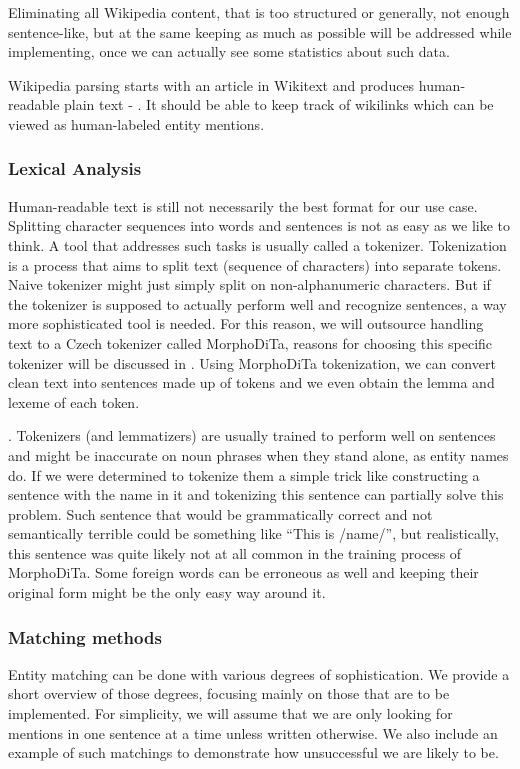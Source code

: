 Eliminating all Wikipedia content, that is too structured or generally, not enough sentence-like, but at the same keeping as much as possible will be addressed while implementing, once we can actually see some statistics about such data.

Wikipedia parsing starts with an article in Wikitext and produces human-readable plain text - . It should be able to keep track of wikilinks which can be viewed as human-labeled entity mentions.

\subsubsection{Lexical Analysis}
Human-readable text is still not necessarily the best format for our use case. Splitting character sequences into words and sentences is not as easy as we like to think. A tool that addresses such tasks is usually called a tokenizer.
Tokenization is a process that aims to split text (sequence of characters) into separate tokens. Naive tokenizer might just simply split on non-alphanumeric characters. But if the tokenizer is supposed to actually perform well and recognize sentences, a way more sophisticated tool is needed. For this reason, we will outsource handling text to a Czech tokenizer called MorphoDiTa, reasons for choosing this specific tokenizer will be discussed in . Using MorphoDiTa tokenization, we can convert clean text into sentences made up of tokens and we even obtain the lemma and lexeme of each token.

. Tokenizers (and lemmatizers) are usually trained to perform well on sentences and might be inaccurate on noun phrases when they stand alone, as entity names do. If we were determined to tokenize them a simple trick like constructing a sentence with the name in it and tokenizing this sentence can partially solve this problem. Such sentence that would be grammatically correct and not semantically terrible could be something like “This is /name/”, but realistically, this sentence was quite likely not at all common in the training process of MorphoDiTa. Some foreign words can be erroneous as well and keeping their original form might be the only easy way around it.

\subsubsection{Matching methods}
Entity matching can be done with various degrees of sophistication. We provide a short overview of those degrees, focusing mainly on those that are to be implemented. For simplicity, we will assume that we are only looking for mentions in one sentence at a time unless written otherwise. We also include an example of such matchings to demonstrate how unsuccessful we are likely to be.


